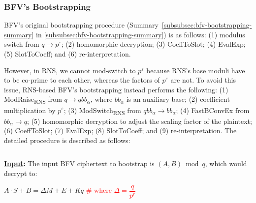 \subsubsection{BFV's Bootstrapping}
\label{subsubsec:rns-bfv-bootstrapping}

BFV's original bootstrapping procedure (Summary~\ref*{subsubsec:bfv-bootstrapping-summary} in \autoref{subsubsec:bfv-bootstrapping-summary}) is as follows: (1) modulus switch from $q \rightarrow p^\varepsilon$; (2) homomorphic decryption; (3) \textsf{CoeffToSlot}; (4) \textsf{EvalExp}; (5) \textsf{SlotToCoeff}; and (6) re-interpretation. 

However, in RNS, we cannot mod-switch to $p^\varepsilon$ because RNS's base moduli have to be co-prime to each other, whereas the factors of $p^\varepsilon$ are not. To avoid this issue, RNS-based BFV's bootstrapping instead performs the following: (1) \textsf{ModRaise\textsubscript{RNS}} from $q \rightarrow qbb_\alpha$, where $bb_\alpha$ is an auxiliary base; (2) coefficient multiplication by $p^\varepsilon$; (3) \textsf{ModSwitch\textsubscript{RNS}} from $qbb_\alpha \rightarrow bb_\alpha$; (4) \textsf{FastBConvEx} from $bb_\alpha \rightarrow q$; (5) homomorphic decryption to adjust the scaling factor of the plaintext; (6) \textsf{CoeffToSlot}; (7) \textsf{EvalExp}; (8) \textsf{SlotToCoeff}; and (9) re-interpretation. The detailed procedure is described as follows:

$ $

\textbf{\underline{Input}:} The input BFV ciphertext to bootstrap is $(A, B) \bmod q$, which would decrypt to:  

$A\cdot S + B = \Delta M + E + Kq$ \textcolor{red}{ \# where $\Delta = \dfrac{q}{p^r}$}

$ $

